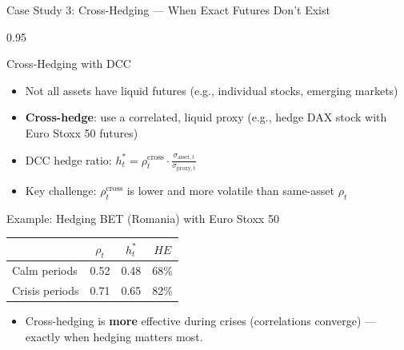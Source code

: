 \documentclass[9pt, aspectratio=169, t]{beamer}
\begin{document}
\begin{frame}{Case Study 3: Cross-Hedging --- When Exact Futures Don't Exist}
    \begin{cminipage}{0.95\textwidth}
    {\footnotesize
    \begin{block}{Cross-Hedging with DCC}
        \begin{itemize}\setlength{\itemsep}{1pt}
            \item Not all assets have liquid futures (e.g., individual stocks, emerging markets)
            \item \textbf{Cross-hedge}: use a correlated, liquid proxy (e.g., hedge DAX stock with Euro Stoxx 50 futures)
            \item DCC hedge ratio: $h_t^* = \rho_t^{\text{cross}} \cdot \frac{\sigma_{\text{asset},t}}{\sigma_{\text{proxy},t}}$
            \item Key challenge: $\rho_t^{\text{cross}}$ is lower and more volatile than same-asset $\rho_t$
        \end{itemize}
    \end{block}
    \begin{exampleblock}{Example: Hedging BET (Romania) with Euro Stoxx 50}
        {\small
        \begin{center}
        \begin{tabular}{l|ccc}
            \hline
            & $\rho_t$ & $h_t^*$ & $HE$ \\
            \hline
            Calm periods    & 0.52 & 0.48 & 68\% \\
            Crisis periods  & 0.71 & 0.65 & 82\% \\
            \hline
        \end{tabular}
        \end{center}
        }
        \begin{itemize}\setlength{\itemsep}{0pt}
            \item Cross-hedging is \textbf{more} effective during crises (correlations converge) --- exactly when hedging matters most.
        \end{itemize}
    \end{exampleblock}
    }
    \end{cminipage}
\end{frame}
\end{document}
